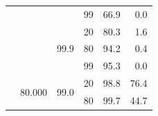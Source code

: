 \documentclass{article}
\begin{document}
\begin{table}
\begin{tabular}{|c|c|c|c|r|r|}
                                    &                                                                                        &                                                                                          & 99                                                                                      & 66.9                                                                      & 0.0                                                                       \\ \cline{3-6} 
                                    &                                                                                        & \multirow{3}{*}{99.9}                                                                    & 20                                                                                      & 80.3                                                                      & 1.6                                                                       \\ \cline{4-6} 
                                    &                                                                                        &                                                                                          & 80                                                                                      & 94.2                                                                      & 0.4                                                                       \\ \cline{4-6} 
                                    &                                                                                        &                                                                                          & 99                                                                                      & 95.3                                                                      & 0.0                                                                       \\ \cline{2-6} 
                                    & \multirow{6}{*}{80.000}                                                                    & \multirow{3}{*}{99.0}                                                                    & 20                                                                                      & 98.8                                                                      & 76.4                                                                      \\ \cline{4-6} 
                                    &                                                                                        &                                                                                          & 80                                                                                      & 99.7                                                                      & 44.7                                                                      \\ \cline{4-6} 

\end{tabular}
\end{table}
\end{document}
